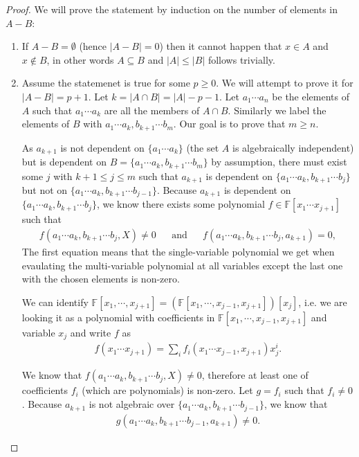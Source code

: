 \begin{proof}
	We will prove the statement by induction on the number of elements in $A - B$:
	\begin{enumerate}
		\item  If $A - B = \emptyset $ (hence $|A -B| = 0$) then it cannot happen that $x\in A$ and $x\notin B$, in other words $A \subseteq B$ and $|A| \leq |B|$ follows trivially.
		\item  Assume the statemenet is true for some $p\geq 0 $. We will attempt to prove it for $|A - B| = p + 1$. Let $k = |A \cap B| = |A| - p - 1$. Let $a _1 \cdots a _n$ be the elements of $A$ such that $a _1 \cdots a_k$ are all the members of $A \cap B$. Similarly we label the elements of $B$ with $ a _1 \cdots a_k, b _{k + 1} \cdots b _m$. Our goal is to prove that $m \geq n$.

		      As $a _{k + 1}$ is not dependent on $\{a _1 \cdots a_k\}$ (the set $A$ is algebraically independent) but is dependent on $B = \{a _1 \cdots a _k, b _{k + 1} \cdots b_m\}$ by assumption, there must exist some $j$ with $k + 1 \leq j \leq m$ such that $a _{k + 1}$ is dependent on $\{a _1 \cdots a _k, b _{k + 1} \cdots b_j\}$ but  not on $\{a _1 \cdots a _k, b _{k + 1} \cdots b _{j - 1}\}$. Because $a _{k + 1}$ is dependent on $\{a _1 \cdots a _k, b _{k + 1} \cdots b_j\}$, we know there exists some polynomial $f \in \mathbb F[x _1 \cdots x _{j + 1}]$ such that
		      \begin{align*}
			      f(a _1 \cdots a _{k}, b _{k + 1} \cdots b _{j}, X) \neq  0 &&\text{and}&&
			      f(a _1 \cdots a _{k}, b _{k + 1} \cdots b _{j}, a _{k + 1})  = 0,
		      \end{align*}
        The first equation means that the single-variable polynomial we get when evaulating the multi-variable polynomial at all variables except the last one with the chosen elements is non-zero. 

		      We can identify $\mathbb{F}[x_1,\cdots,x_{j+1}] = (\mathbb{F}[x_1,\cdots, x_{j-1}, x_{j+1}])[x_j]$, i.e. we are looking it as a polynomial with coefficients in  $\mathbb{F}[x_1,\cdots, x_{j-1}, x_{j+1}]$ and variable $x_j$ and write $f$ as
		      \begin{align*}
			      f(x _1 \cdots x _{j + 1})
			      = \sum_i f _i(x _1 \cdots x _{j - 1}, x _{j + 1}) x _j ^i.
		      \end{align*}

		      We know that $f(a _1 \cdots a _{k}, b _{k + 1} \cdots b _{j}, X) \neq  0$, therefore at least one of coefficients $f _i $ (which are polynomials) is non-zero. Let $g = f _i $ such that $f _i \neq 0$. Because $a _{k + 1}$ is not algebraic over $\{a _1 \cdots a _k, b _{k + 1} \cdots b _{j - 1}\}$, we know that
		      \begin{align*}
			      g(a _1 \cdots a _k, b _{k + 1} \cdots b _{j - 1}, a _{k + 1}) \neq 0.
		      \end{align*}


\end{enumerate}
\end{proof}
